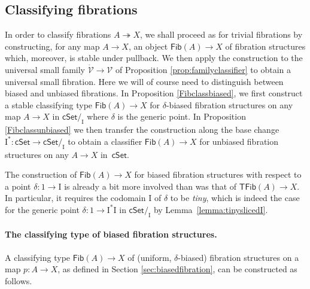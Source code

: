 \documentclass[12pt]{article}
\newcommand{\cSet}{\ensuremath{\mathsf{cSet}}}
\newcommand{\ra}{\ensuremath{\rightarrow}}
\newcommand{\fib}{\ensuremath{\twoheadrightarrow}}
\renewcommand{\to}{\ensuremath{\rightarrow}}
\newcommand{\I}{\ensuremath{\mathrm{I}}}
\newcommand{\V}{\ensuremath{\mathcal{V}}}
\newcommand{\VV}{\ensuremath{\dot{\mathcal{V}}}}
\newcommand{\Fib}{\ensuremath{\mathsf{Fib}}}
\newcommand{\TFib}{\ensuremath{\mathsf{TFib}}}
\theoremstyle{remark}
\theoremstyle{definition}
\begin{document}
\subsection{Classifying fibrations}\label{sec:universalfibration}

In order to classify fibrations $A\fib X$, we shall proceed as for trivial fibrations by constructing, for any map $A\ra X$, an object $\Fib(A)\to X$ of fibration structures which, moreover, is stable under pullback.  We then apply the construction to the universal small family $\VV\ra\V$ of Proposition \ref{prop:familyclassifier} to obtain a universal small fibration.    Here we will of course need to distinguish between biased and unbiased fibrations.  In Proposition \ref{Fibclassbiased}, we first construct a stable classifying type $\Fib(A)\ra X$ for $\delta$-biased fibration structures on any map $A\to X$ in $\cSet/_\I$ where $\delta$ is the generic point.    In Proposition \ref{Fibclassunbiased} we then transfer the construction along the base change $\I^* : \cSet \to \cSet/_\I$ to obtain a classifier $\Fib(A)\ra X$ for unbiased fibration structures on any $A\to X$ in~$\cSet$.

The construction of $\Fib(A)\ra X$ for biased fibration structures with respect to a point $\delta : 1\to \I$ is already a bit more involved than was that of $\TFib(A)\ra X$.  In particular, it requires the codomain $\I$ of $\delta$ to be \emph{tiny}, which is indeed the case for the generic point $\delta : 1 \to  \I^*\I$ in $\cSet/_\I$ by Lemma~\ref{lemma:tinyslicedI}.

\paragraph{The classifying type of biased fibration structures.}

A classifying type $\Fib(A)\ra X$ of (uniform, $\delta$-biased) fibration structures on a map $p: A\ra X$, 
as defined in Section \ref{sec:biasedfibration}, can be constructed as follows.
\end{document}
